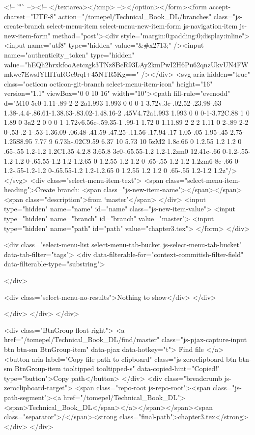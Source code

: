           <!-- '"` --><!-- </textarea></xmp> --></option></form><form accept-charset="UTF-8" action="/tomepel/Technical_Book_DL/branches" class="js-create-branch select-menu-item select-menu-new-item-form js-navigation-item js-new-item-form" method="post"><div style="margin:0;padding:0;display:inline"><input name="utf8" type="hidden" value="&#x2713;" /><input name="authenticity_token" type="hidden" value="hEQh2hrxkfooAetczgk3TNz8BcR93LAy2kmPwI2H6Pu62qnzUkvUN4FWmkwc7EwsIYHITuRGe9rqI+45NTR5Kg==" /></div>
          <svg aria-hidden="true" class="octicon octicon-git-branch select-menu-item-icon" height="16" version="1.1" viewBox="0 0 10 16" width="10"><path fill-rule="evenodd" d="M10 5c0-1.11-.89-2-2-2a1.993 1.993 0 0 0-1 3.72v.3c-.02.52-.23.98-.63 1.38-.4.4-.86.61-1.38.63-.83.02-1.48.16-2 .45V4.72a1.993 1.993 0 0 0-1-3.72C.88 1 0 1.89 0 3a2 2 0 0 0 1 1.72v6.56c-.59.35-1 .99-1 1.72 0 1.11.89 2 2 2 1.11 0 2-.89 2-2 0-.53-.2-1-.53-1.36.09-.06.48-.41.59-.47.25-.11.56-.17.94-.17 1.05-.05 1.95-.45 2.75-1.25S8.95 7.77 9 6.73h-.02C9.59 6.37 10 5.73 10 5zM2 1.8c.66 0 1.2.55 1.2 1.2 0 .65-.55 1.2-1.2 1.2C1.35 4.2.8 3.65.8 3c0-.65.55-1.2 1.2-1.2zm0 12.41c-.66 0-1.2-.55-1.2-1.2 0-.65.55-1.2 1.2-1.2.65 0 1.2.55 1.2 1.2 0 .65-.55 1.2-1.2 1.2zm6-8c-.66 0-1.2-.55-1.2-1.2 0-.65.55-1.2 1.2-1.2.65 0 1.2.55 1.2 1.2 0 .65-.55 1.2-1.2 1.2z"/></svg>
            <div class="select-menu-item-text">
              <span class="select-menu-item-heading">Create branch: <span class="js-new-item-name"></span></span>
              <span class="description">from ‘master’</span>
            </div>
            <input type="hidden" name="name" id="name" class="js-new-item-value">
            <input type="hidden" name="branch" id="branch" value="master">
            <input type="hidden" name="path" id="path" value="chapter3.tex">
</form>
      </div>

      <div class="select-menu-list select-menu-tab-bucket js-select-menu-tab-bucket" data-tab-filter="tags">
        <div data-filterable-for="context-commitish-filter-field" data-filterable-type="substring">


        </div>

        <div class="select-menu-no-results">Nothing to show</div>
      </div>

    </div>
  </div>
</div>

    <div class="BtnGroup float-right">
      <a href="/tomepel/Technical_Book_DL/find/master"
            class="js-pjax-capture-input btn btn-sm BtnGroup-item"
            data-pjax
            data-hotkey="t">
        Find file
      </a>
      <button aria-label="Copy file path to clipboard" class="js-zeroclipboard btn btn-sm BtnGroup-item tooltipped tooltipped-s" data-copied-hint="Copied!" type="button">Copy path</button>
    </div>
    <div class="breadcrumb js-zeroclipboard-target">
      <span class="repo-root js-repo-root"><span class="js-path-segment"><a href="/tomepel/Technical_Book_DL"><span>Technical_Book_DL</span></a></span></span><span class="separator">/</span><strong class="final-path">chapter3.tex</strong>
    </div>
  </div>


